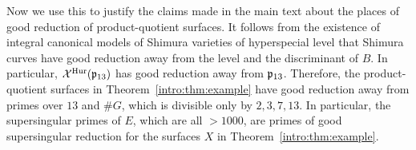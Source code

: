 \documentclass[main.tex]{subfiles}
\begin{document}
Now we use this to justify the claims made in the main text about the places of good reduction of product-quotient surfaces. It follows from the existence of integral canonical models of Shimura varieties of hyperspecial level \cite{carayol:representations, kisin:integral_models} that Shimura curves have good reduction away from the level and the discriminant of $B$. In particular, $\mathcal{X}^{\mathrm{Hur}}(\mathfrak{p}_{13})$ has good reduction away from $\mathfrak{p}_{13}$. Therefore, the product-quotient surfaces in Theorem~\ref{intro:thm:example} have good reduction away from primes over $13$ and $\# G$, which is divisible only by $2,3,7,13$. In particular, the supersingular primes of $E$, which are all $>1000$, are primes of good supersingular reduction for the surfaces $X$ in Theorem~\ref{intro:thm:example}.


\ifSubfilesClassLoaded{%
  
  
}{}
\end{document}
